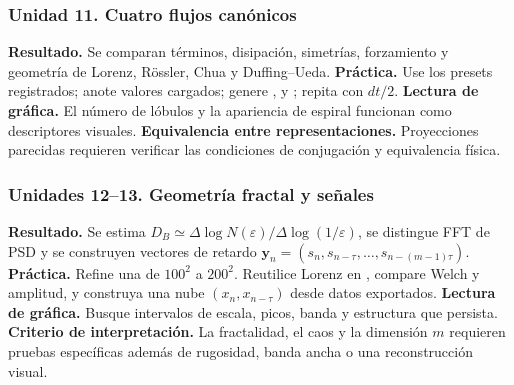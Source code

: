 \subsubsection*{Unidad 11. Cuatro flujos canónicos}
\textbf{Resultado.} Se comparan términos, disipación, simetrías, forzamiento y
geometría de Lorenz, Rössler, Chua y Duffing--Ueda.
\textbf{Práctica.} Use los presets registrados; anote valores cargados; genere
,  y ; repita con \(dt/2\).
\textbf{Lectura de gráfica.} El número de lóbulos y la apariencia de espiral funcionan
como descriptores visuales. \textbf{Equivalencia entre representaciones.} Proyecciones
parecidas requieren verificar las condiciones de conjugación y equivalencia física.

\subsubsection*{Unidades 12--13. Geometría fractal y señales}
\textbf{Resultado.} Se estima
\(D_B\simeq\Delta\log N(\varepsilon)/\Delta\log(1/\varepsilon)\), se distingue FFT
de PSD y se construyen vectores de retardo
\(\mathbf y_n=(s_n,s_{n-\tau},\ldots,s_{n-(m-1)\tau})\).
\textbf{Práctica.} Refine una  de \(100^2\) a \(200^2\).
Reutilice Lorenz en , compare Welch y amplitud, y construya una nube
\((x_n,x_{n-\tau})\) desde datos exportados.
\textbf{Lectura de gráfica.} Busque intervalos de escala, picos, banda y estructura
que persista. \textbf{Criterio de interpretación.} La fractalidad, el caos y la dimensión \(m\) requieren pruebas específicas además de rugosidad, banda ancha o una reconstrucción visual.

